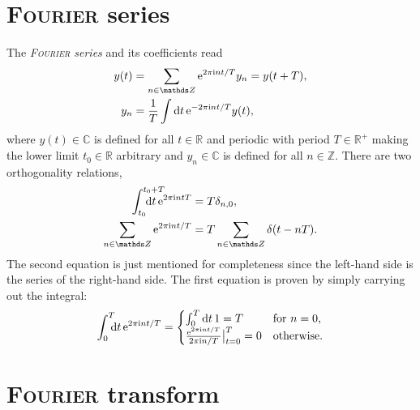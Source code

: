 \section{\textsc{Fourier} series}

The \emph{\textsc{Fourier} series} and its coefficients read
%
\begin{align*}
    y(t) &= \sum_{n \in \mathds Z} \E^{2 \pi \I n t / T} y_n = y(t + T), \\
    y_n &= \frac 1 T \int \D t \, \E^{-2 \pi \I n t / T} y(t),
\end{align*}
%
where $y(t) \in \mathds C$ is defined for all $t \in \mathds R$ and periodic
with period $T \in \mathds R^+$ making the lower limit $t_0 \in \mathds R$
arbitrary and $y_n \in \mathds C$ is defined for all $n \in \mathds Z$. There
are two orthogonality relations,
%
\begin{align*}
    \int \from{t_0} \till{t_0 + T} \D t \, \E^{2 \pi \I n t T}
    &= T \delta_{n, 0},
    \\
    \sum_{n \in \mathds Z} \E^{2 \pi \I n t / T}
    &= T \sum_{n \in \mathds Z} \delta(t - n T).
\end{align*}
%
The second equation is just mentioned for completeness since the left-hand side
is the  series of the right-hand side. The first equation is
proven by simply carrying out the integral:
%
\begin{equation*}
    \int \from 0 \till T \D t \, \E^{2 \pi \I n t / T} =
    \begin{cases}
        \int_0^ T \D t \, 1 = T
            & \text{for $n = 0$,} \\
        \frac{\E^{2 \pi \I n t / T}}{2 \pi \I n / T} \big|_{t = 0}^T = 0
            & \text{otherwise.}
    \end{cases}
\end{equation*}

\section{\textsc{Fourier} transform}

